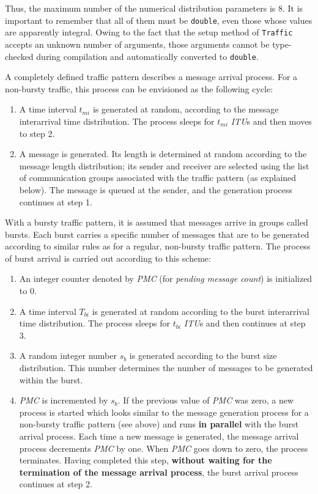 Thus, the maximum number of the numerical distribution parameters is 8.
It is important to remember that all of them must be {\tt double},
even those whose values are apparently integral.
Owing to the fact that the setup method of {\tt Traffic} accepts an unknown
number of arguments, those arguments cannot be type-checked during compilation
and automatically converted to {\tt double}.

A completely defined traffic pattern describes a message arrival process.
For a non-bursty traffic, this process can be envisioned as the following
cycle:
\begin{enumerate}
\item
A time interval $t_{mi}$ is generated at random, according to the message
interarrival time distribution.
The process sleeps for $t_{mi}$ {\em ITU\/}s and then moves to step 2.
\item
A message is generated.
Its length is determined at random according to the message length
distribution; its sender and receiver are selected using the list of
communication groups associated with the traffic pattern (as explained below).
The message is queued at the sender, and the generation process continues
at step 1.
\end{enumerate}

With a bursty traffic pattern, it is assumed that messages arrive in
groups called bursts.
Each burst carries a specific number of messages that are to be generated
according to similar rules as for a regular, non-bursty traffic pattern.
The process of burst arrival is carried out according to this scheme:
\begin{enumerate}
\item
An integer counter denoted by {\em PMC\/} (for {\em pending message count\/})
is initialized to 0.
\item
A time interval $T_{bi}$
is generated at random according to the burst
interarrival time distribution.
The process sleeps for $t_{bi}$
{\em ITU\/}s and then continues at step 3.
\item
A random integer number $s_b$ is generated according to the burst size
distribution.
This number determines the number of messages to be generated within the burst.
\item
{\em PMC\/} is incremented by $s_b$.
If the previous value of {\em PMC\/} was zero, a new process is started which
looks
similar to the message generation process for a non-bursty traffic pattern (see
above) and runs {\bf in parallel} with the burst arrival process.
Each time a new message is generated, the message arrival process decrements
{\em PMC\/} by one.
When {\em PMC\/} goes down to zero, the process terminates.
Having completed this step, {\bf without waiting for the termination of the
message arrival process}, the burst arrival process continues at step 2.
\end{enumerate}

